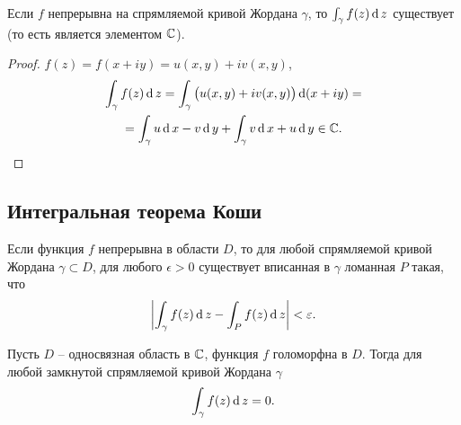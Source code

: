 \begin{theorem}
	Если $f$ непрерывна на спрямляемой кривой Жордана $\gamma $, то $\int_{\gamma } f(z)\operatorname{d} z$ существует (то есть является элементом $\mathbb{C}$).
\end{theorem}

\begin{proof}
	$f(z) = f(x + iy) = u(x,y) + iv(x,y)$,
	\begin{multline*}
		\int_{\gamma } f(z)\operatorname{d} z = \int_{\gamma } \big(u(x,y)+iv(x,y)\big)\operatorname{d}(x+iy) = \\ = \int_{\gamma } u\operatorname{d} x - v\operatorname{d} y + \int_{\gamma } v\operatorname{d} x + u\operatorname{d} y \in \mathbb{C}.
	\end{multline*}
\end{proof}

\subsection{Интегральная теорема Коши}

\begin{lemma}[Грусса]
	Если функция $f$ непрерывна в области $D$, то для любой спрямляемой кривой Жордана $\gamma \subset D$, для любого $\epsilon > 0$ существует вписанная в $\gamma $ ломанная $P$ такая, что
	\[
		\left|\int_{\gamma } f(z)\operatorname{d} z - \int_{P} f(z)\operatorname{d} z\right| < \varepsilon.
	\]
\end{lemma}

\begin{theorem}
	Пусть $D$ -- односвязная область в $\mathbb{C}$, функция $f$ голоморфна в $D$. Тогда для любой замкнутой спрямляемой кривой Жордана $\gamma $
	\[
		\int_{\gamma } f(z)\operatorname{d} z = 0.
	\]
\end{theorem}


